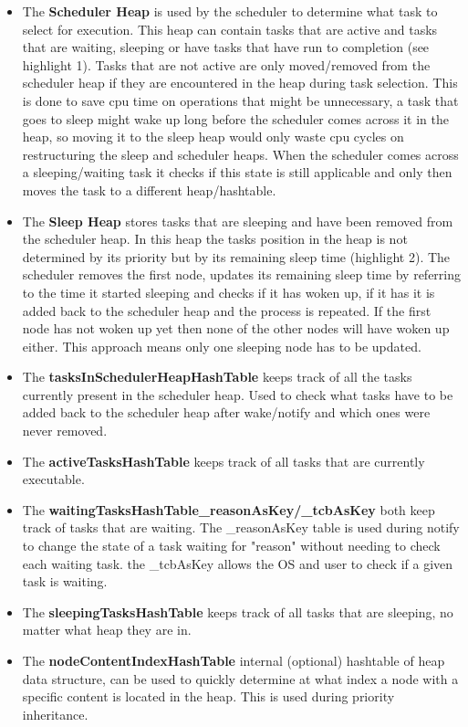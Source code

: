 \documentclass[12pt,a4paper]{article}
\begin{document}
\begin{itemize}
  \item The \textbf{Scheduler Heap} is used by the scheduler to determine what task to select for execution. This heap can contain tasks that are active and tasks that are waiting, sleeping or have tasks that have run to completion (see highlight 1). Tasks that are not active are only moved/removed from the scheduler heap if they are encountered in the heap during task selection. This is done to save cpu time on operations that might be unnecessary, a task that goes to sleep might wake up long before the scheduler comes across it in the heap, so moving it to the sleep heap would only waste cpu cycles on restructuring the sleep and scheduler heaps. When the scheduler comes across a sleeping/waiting task it checks if this state is still applicable and only then moves the task to a different heap/hashtable.
  \item The \textbf{Sleep Heap} stores tasks that are sleeping and have been removed from the scheduler heap. In this heap the tasks position in the heap is not determined by its priority but by its remaining sleep time (highlight 2). The scheduler removes the first node, updates its remaining sleep time by referring to the time it started sleeping and checks if it has woken up, if it has it is added back to the scheduler heap and the process is repeated. If the first node has not woken up yet then none of the other nodes will have woken up either. This approach means only one sleeping node has to be updated.
  \item The \textbf{tasksInSchedulerHeapHashTable} keeps track of all the tasks currently present in the scheduler heap. Used to check what tasks have to be added back to the scheduler heap after wake/notify and which ones were never removed.
  \item The \textbf{activeTasksHashTable} keeps track of all tasks that are currently executable.
  \item The \textbf{waitingTasksHashTable\_reasonAsKey/\_tcbAsKey} both keep track of tasks that are waiting. The \_reasonAsKey table is used during notify to change the state of a task waiting for "reason" without needing to check each waiting task. the \_tcbAsKey allows the OS and user to check if a given task is waiting.
  \item The  \textbf{sleepingTasksHashTable} keeps track of all tasks that are sleeping, no matter what heap they are in.
  \item The  \textbf{nodeContentIndexHashTable} internal (optional) hashtable of heap data structure, can be used to quickly determine at what index a node with a specific content is located in the heap. This is used during priority inheritance.
\end{itemize}
\end{document}
